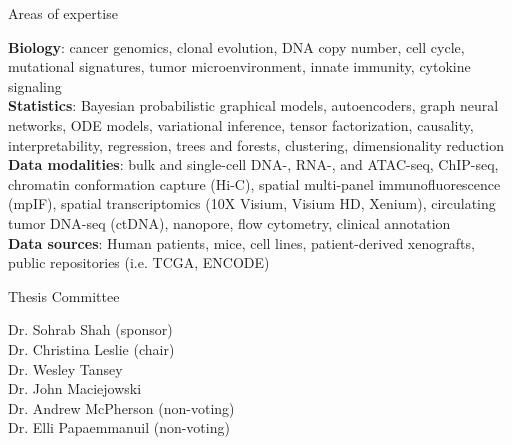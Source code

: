 \documentclass{resume} %
\begin{document}

\begin{rSection}{Areas of expertise}

\textbf{Biology}: cancer genomics, clonal evolution, DNA copy number, cell cycle, mutational signatures, tumor microenvironment, innate immunity, cytokine signaling \\
\textbf{Statistics}: Bayesian probabilistic graphical models, autoencoders, graph neural networks, ODE models, variational inference, tensor factorization, causality, interpretability, regression, trees and forests, clustering, dimensionality reduction \\
\textbf{Data modalities}: bulk and single-cell DNA-, RNA-, and ATAC-seq, ChIP-seq, chromatin conformation capture (Hi-C), spatial multi-panel immunofluorescence (mpIF), spatial transcriptomics (10X Visium, Visium HD, Xenium), circulating tumor DNA-seq (ctDNA), nanopore, flow cytometry, clinical annotation \\
\textbf{Data sources}: Human patients, mice, cell lines, patient-derived xenografts, public repositories (i.e. TCGA, ENCODE)


\end{rSection}


\begin{rSection}{Thesis Committee}

Dr. Sohrab Shah (sponsor) \\
Dr. Christina Leslie (chair) \\
Dr. Wesley Tansey \\
Dr. John Maciejowski \\
Dr. Andrew McPherson (non-voting) \\
Dr. Elli Papaemmanuil (non-voting)

\end{rSection}


\end{document}
